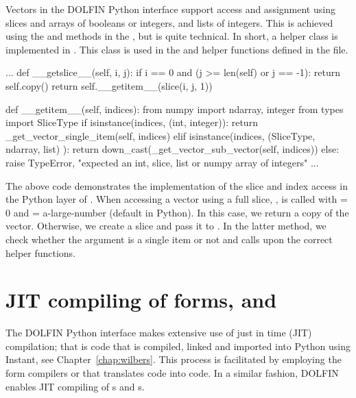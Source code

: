 Vectors in the DOLFIN Python interface support access and assignment using slices and
\numpy arrays of booleans or integers, and lists of integers. This
is achieved using the  and  methods in the
, but is quite technical. In short, a helper class
 is implemented in . This class is used in
the  and  helper functions defined
in the  file.
\begin{python}
   ...
    def __getslice__(self, i, j):
        if i == 0 and (j >= len(self) or j == -1):
            return self.copy()
        return self.__getitem__(slice(i, j, 1))

    def __getitem__(self, indices):
        from numpy import ndarray, integer
        from types import SliceType
        if isinstance(indices, (int, integer)):
            return _get_vector_single_item(self, indices)
        elif isinstance(indices, (SliceType, ndarray, list) ):
            return down_cast(_get_vector_sub_vector(self, indices))
        else:
            raise TypeError, "expected an int, slice, list or numpy array of integers"
  ...
\end{python}
The above code demonstrates the implementation of the slice and index
access in the Python layer of . When accessing a
vector using a full slice, ,  is called
with  = 0 and  = a-large-number (default in Python).
In this case, we return a copy of the vector. Otherwise, we create a
slice and pass it to . In the latter method, we
check whether the  argument is a single item or not and
calls upon the correct helper functions.

\section{JIT compiling of \ufl forms,  and }
The DOLFIN Python interface makes extensive use of just in time (JIT) compilation;
that is code that is compiled, linked and imported into Python using
Instant, see Chapter~\ref{chap:wilbers}. This process is facilitated
by employing the form compilers \ffc or \sfc that translates \ufl code
into \ufc code.  In a similar fashion, DOLFIN enables JIT compiling
of s and s.

